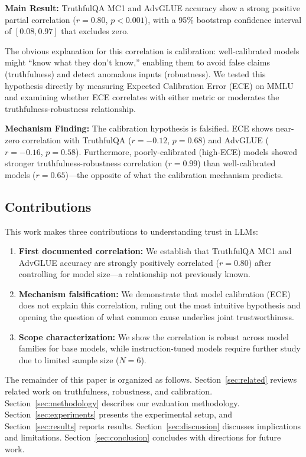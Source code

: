 \textbf{Main Result:} TruthfulQA MC1 and AdvGLUE accuracy show a strong positive partial correlation ($r=0.80$, $p<0.001$), with a 95\% bootstrap confidence interval of $[0.08, 0.97]$ that excludes zero.

The obvious explanation for this correlation is calibration: well-calibrated models might ``know what they don't know,'' enabling them to avoid false claims (truthfulness) and detect anomalous inputs (robustness). We tested this hypothesis directly by measuring Expected Calibration Error (ECE) on MMLU and examining whether ECE correlates with either metric or moderates the truthfulness-robustness relationship.

\textbf{Mechanism Finding:} The calibration hypothesis is falsified. ECE shows near-zero correlation with TruthfulQA ($r=-0.12$, $p=0.68$) and AdvGLUE ($r=-0.16$, $p=0.58$). Furthermore, poorly-calibrated (high-ECE) models showed stronger truthfulness-robustness correlation ($r=0.99$) than well-calibrated models ($r=0.65$)---the opposite of what the calibration mechanism predicts.

\subsection{Contributions}

This work makes three contributions to understanding trust in LLMs:

\begin{enumerate}
    \item \textbf{First documented correlation:} We establish that TruthfulQA MC1 and AdvGLUE accuracy are strongly positively correlated ($r=0.80$) after controlling for model size---a relationship not previously known.

    \item \textbf{Mechanism falsification:} We demonstrate that model calibration (ECE) does not explain this correlation, ruling out the most intuitive hypothesis and opening the question of what common cause underlies joint trustworthiness.

    \item \textbf{Scope characterization:} We show the correlation is robust across model families for base models, while instruction-tuned models require further study due to limited sample size ($N=6$).
\end{enumerate}

The remainder of this paper is organized as follows. Section~\ref{sec:related} reviews related work on truthfulness, robustness, and calibration. Section~\ref{sec:methodology} describes our evaluation methodology. Section~\ref{sec:experiments} presents the experimental setup, and Section~\ref{sec:results} reports results. Section~\ref{sec:discussion} discusses implications and limitations. Section~\ref{sec:conclusion} concludes with directions for future work.
